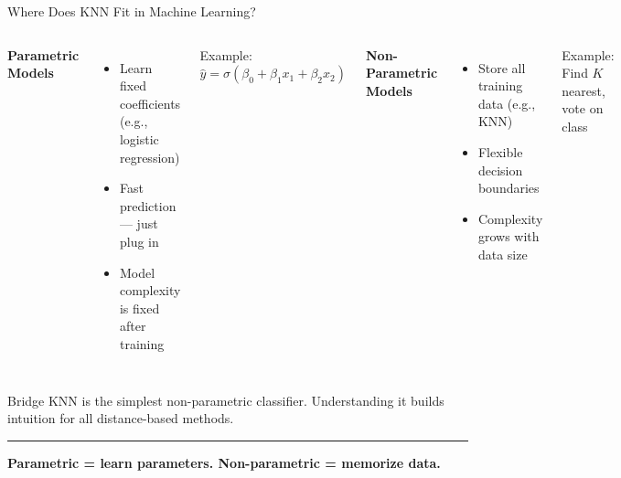 \documentclass[8pt,aspectratio=169]{beamer}
\newcommand{\bottomnote}[1]{%
\vfill
\vspace{-2mm}
\textcolor{mllavender2}{\rule{\textwidth}{0.4pt}}
\vspace{1mm}
\footnotesize
\textbf{#1}
}
\newenvironment{compactlist}{%
  \begin{itemize}%
    \setlength{\itemsep}{2pt}%
    \setlength{\parskip}{0pt}%
    \setlength{\parsep}{0pt}%
}{%
  \end{itemize}%
}
\begin{document}
\begin{frame}[t]{Where Does KNN Fit in Machine Learning?}
\begin{columns}[T]
\small
\textbf{Parametric Models}

\footnotesize
\begin{compactlist}
\item \footnotesize Learn fixed coefficients (e.g., logistic regression)
\item \footnotesize Fast prediction --- just plug in
\item \footnotesize Model complexity is fixed after training
\end{compactlist}

\vspace{2mm}
\textcolor{mlblue}{Example:} $\hat{y} = \sigma(\beta_0 + \beta_1 x_1 + \beta_2 x_2)$

\small
\textbf{Non-Parametric Models}

\footnotesize
\begin{compactlist}
\item \footnotesize Store all training data (e.g., KNN)
\item \footnotesize Flexible decision boundaries
\item \footnotesize Complexity grows with data size
\end{compactlist}

\vspace{2mm}
\textcolor{mlblue}{Example:} Find $K$ nearest, vote on class
\end{columns}

\vspace{3mm}
\begin{block}{Bridge}
\footnotesize KNN is the simplest non-parametric classifier. Understanding it builds intuition for all distance-based methods.
\end{block}
\bottomnote{Parametric = learn parameters. Non-parametric = memorize data.}
\end{frame}

\end{document}
